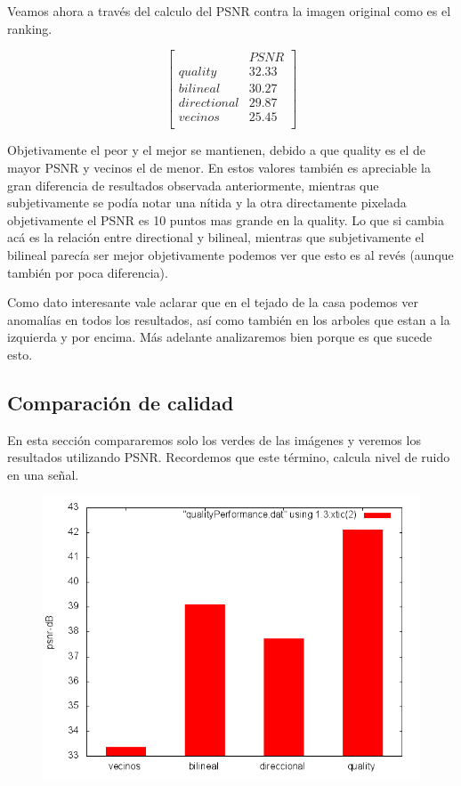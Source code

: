 {Veamos ahora a través del calculo del PSNR contra la imagen original como es el ranking.

$$ 
\begin{bmatrix}
           &      PSNR    \\
       quality    &   32.33   \\
       bilineal    &      30.27   \\
       directional    &      29.87    \\
       vecinos   &      25.45     \\
\end{bmatrix} 
$$

Objetivamente el peor y el mejor se mantienen, debido a que quality es el de mayor PSNR y vecinos el de menor. En estos valores también es apreciable la gran diferencia de resultados observada anteriormente, mientras que subjetivamente se podía notar una nítida y la otra directamente pixelada objetivamente el PSNR es 10 puntos mas grande en la quality. Lo que si cambia acá es la relación entre directional y bilineal, mientras que subjetivamente el bilineal parecía ser mejor objetivamente podemos ver que esto es al revés (aunque también por poca diferencia).

Como dato interesante vale aclarar que en el tejado de la casa podemos ver anomalías en todos los resultados, así como también en los arboles que estan a la izquierda y por encima. Más adelante analizaremos bien porque es que sucede esto.


\subsection{Comparación de calidad}
En esta sección compararemos solo los verdes de las imágenes y veremos los resultados utilizando PSNR. Recordemos que este término, calcula nivel de ruido en una señal.

\begin{figure}[h]
       \includegraphics[width=1\textwidth]{imagenes/quality_performance.png}
\end{figure}

}
